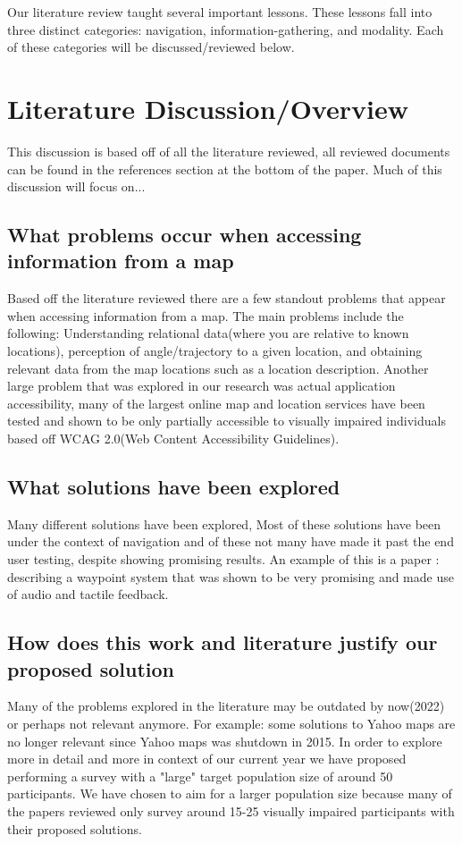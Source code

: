 \documentclass{article}
\begin{document}
Our literature review taught several important lessons. These lessons fall into three distinct categories: navigation, information-gathering, and modality. Each of these categories will be discussed/reviewed below. 

\section{Literature Discussion/Overview}
This discussion is based off of all the literature reviewed, all reviewed documents can be found in the references section at the bottom of the paper. Much of this discussion will focus on...

\subsection{What problems occur when accessing information from a map}
Based off the literature reviewed there are a few standout problems that appear when accessing information from a map. The main problems include the following: Understanding relational data(where you are relative to known locations)\cite{}, perception of angle/trajectory to a given location\cite{}, and obtaining relevant data from the map locations such as a location description\cite{}. Another large problem that was explored in our research was actual application accessibility, many of the largest online map and location services have been tested and shown to be only partially accessible to visually impaired individuals based off WCAG 2.0(Web Content Accessibility Guidelines)\cite{}.

%
\subsection{What solutions have been explored}
Many different solutions have been explored, Most of these solutions have been under the context of navigation and of these not many have made it past the end user testing, 
despite showing promising results. An example of this is a paper : \cite{} describing a waypoint system that was shown to be very promising and made use of audio and tactile feedback. 



\subsection{How does this work and literature justify our proposed solution}
Many of the problems explored in the literature may be outdated by now(2022) or perhaps not relevant anymore. For example: some solutions to Yahoo maps are no longer relevant since Yahoo maps was shutdown in 2015. In order to explore more in detail and more in context of our current year we have proposed performing a survey with a "large" target population size of around 50 participants. We have chosen to aim for a larger population size because many of the papers reviewed only survey around 15-25 visually impaired participants with their proposed solutions.
\end{document}
